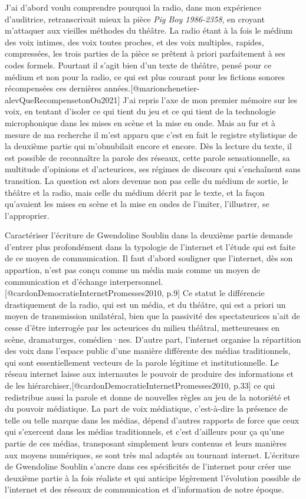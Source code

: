 \documentclass[
]{article}
\begin{document}
J'ai d'abord voulu comprendre pourquoi la radio, dans mon expérience d'auditrice, retranscrivait mieux la pièce \emph{Pig Boy 1986-2358}, en croyant m'attaquer aux vieilles méthodes du théâtre. La radio étant à la fois le médium des voix intimes, des voix toutes proches, et des voix multiples, rapides, compressées, les trois parties de la pièce se prêtent à priori parfaitement à ses codes formels. Pourtant il s'agit bien d'un texte de théâtre, pensé pour ce médium et non pour la radio, ce qui est plus courant pour les fictions sonores récompensées ces dernières années.{[}@marionchenetier-alevQueRecompensetonOu2021{]} J'ai repris l'axe de mon premier mémoire sur les voix, en tentant d'isoler ce qui tient du jeu et ce qui tient de la technologie microphonique dans les mises en scène et la mise en onde. Mais au fur et à mesure de ma recherche il m'est apparu que c'est en fait le registre stylistique de la deuxième partie qui m'obnubilait encore et encore. Dès la lecture du texte, il est possible de reconnaître la parole des réseaux, cette parole sensationnelle, sa multitude d'opinions et d'acteurices, ses régimes de discours qui s'enchaînent sans transition. La question est alors devenue non pas celle du médium de sortie, le théâtre et la radio, mais celle du médium décrit par le texte, et la façon qu'avaient les mises en scène et la mise en ondes de l'imiter, l'illustrer, se l'approprier.

Caractériser l'écriture de Gwendoline Soublin dans la deuxième partie demande d'entrer plus profondément dans la typologie de l'internet et l'étude qui est faite de ce moyen de communication. Il faut d'abord souligner que l'internet, dès son appartion, n'est pas conçu comme un média mais comme un moyen de communication et d'échange interpersonnel.{[}@cardonDemocratieInternetPromesses2010, p.9{]} Ce statut le différencie drastiquement de la radio, qui est un média, et du théâtre, qui est a priori un moyen de transmission unilatéral, bien que la passivité des spectateurices n'ait de cesse d'être interrogée par les acteurices du milieu théâtral, metteureuses en scène, dramaturges, comédien·nes. D'autre part, l'internet organise la répartition des voix dans l'espace public d'une manière différente des médias traditionnels, qui sont essentiellement vecteurs de la parole légitime et institutionnelle. Le réseau internet laisse aux internautes le pouvoir de produire des informations et de les hiérarchiser,{[}@cardonDemocratieInternetPromesses2010, p.33{]} ce qui redistribue aussi la parole et donne de nouvelles règles au jeu de la notoriété et du pouvoir médiatique. La part de voix médiatique, c'est-à-dire la présence de telle ou telle marque dans les médias, dépend d'autres rapports de force que ceux qui s'exercent dans les médias traditionnels, et c'est d'ailleurs pour ça qu'une partie de ces médias, transposant simplement leurs contenus et leurs manières aux moyens numériques, se sont très mal adaptés au tournant internet. L'écriture de Gwendoline Soublin s'ancre dans ces spécificités de l'internet pour créer une deuxième partie à la fois réaliste et qui anticipe légèrement l'évolution possible de l'internet et des réseaux de communication et d'information de notre époque.
\end{document}
